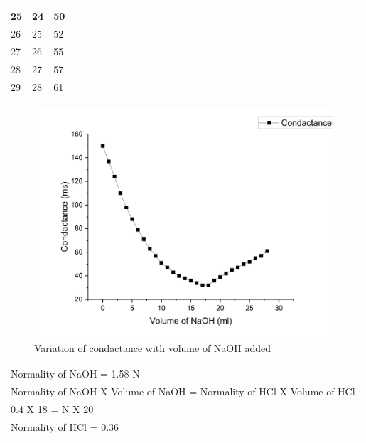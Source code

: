 \documentclass{report}
\begin{document}
\begin{table}[H]
\begin{tabular}{|l|l|l|}
25  & 24                                                                   & 50                                                               \\ \hline
26  & 25                                                                   & 52                                                               \\ \hline
27  & 26                                                                   & 55                                                               \\ \hline
28  & 27                                                                   & 57                                                               \\ \hline
29  & 28                                                                   & 61                                                               \\ \hline
\end{tabular}
\end{table}

\begin{figure}[H]
    \centering
    \includegraphics[width = 15 cm]{condactance.png}
    \caption{Variation of condactance with volume of NaOH added}
\end{figure}

\begin{tabular}{l}
    Normality of NaOH = 1.58 N\\
    Normality of NaOH X Volume of NaOH = Normality of HCl X Volume of HCl\\
    0.4 X 18 = N X 20\\
    Normality of HCl = 0.36
\end{tabular}
\end{document}
